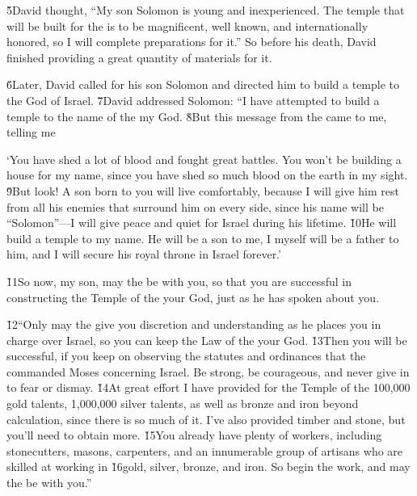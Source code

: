 \v{5}David thought, ``My son Solomon is young and inexperienced. The temple that will be built for the  is to be magnificent, well known, and internationally honored, so I will complete preparations for it.'' So before his death, David finished providing a great quantity of materials for it.

\v{6}Later, David called for his son Solomon and directed him to build a temple to the  God of Israel. \v{7}David addressed Solomon: ``I have attempted to build a temple to the name of the  my God. \v{8}But this message from the  came to me, telling me

\begin{poetry}
\poeml `You have shed a lot of blood and fought great battles. You won't be building a house for my name, since you have shed so much blood on the earth in my sight. \v{9}But look! A son born to you will live comfortably, because I will give him rest from all his enemies that surround him on every side, since his name will be ``Solomon''---I will give peace and quiet for Israel during his lifetime. \v{10}He will build a temple to my name. He will be a son to me, I myself will be a father to him, and I will secure his royal throne in Israel forever.'
\end{poetry}

\v{11}So now, my son, may the  be with you, so that you are successful in constructing the Temple of the  your God, just as he has spoken about you.

\v{12}``Only may the  give you discretion and understanding as he places you in charge over Israel, so you can keep the Law of the  your God. \v{13}Then you will be successful, if you keep on observing the statutes and ordinances that the  commanded Moses concerning Israel. Be strong, be courageous, and never give in to fear or dismay. \v{14}At great effort I have provided for the Temple of the  100,000 gold talents, 1,000,000 silver talents, as well as bronze and iron beyond calculation, since there is so much of it. I've also provided timber and stone, but you'll need to obtain more. \v{15}You already have plenty of workers, including stonecutters, masons, carpenters, and an innumerable group of artisans who are skilled at working in \v{16}gold, silver, bronze, and iron. So begin the work, and may the  be with you.''

